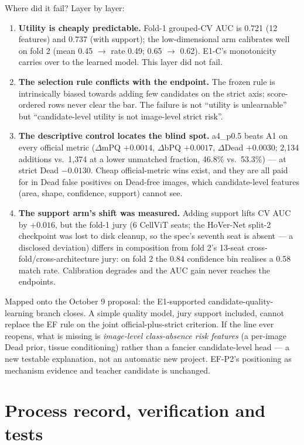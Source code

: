 \documentclass[11pt,a4paper]{article}
\begin{document}
Where did it fail? Layer by layer:

\begin{enumerate}
\item \textbf{Utility is cheaply predictable.} Fold-1 grouped-CV AUC is 0.721 (12 features) and 0.737 (with support); the low-dimensional arm calibrates well on fold 2 (mean 0.45 $\to$ rate 0.49; 0.65 $\to$ 0.62). E1-C's monotonicity carries over to the learned model. This layer did not fail.
\item \textbf{The selection rule conflicts with the endpoint.} The frozen rule is intrinsically biased towards adding few candidates on the strict axis; score-ordered rows never clear the bar. The failure is not ``utility is unlearnable'' but ``candidate-level utility is not image-level strict risk''.
\item \textbf{The descriptive control locates the blind spot.} a4\_p0.5 beats A1 on every official metric ($\Delta$mPQ $+0.0014$, $\Delta$bPQ $+0.0017$, $\Delta$Dead $+0.0030$; 2,134 additions vs.\ 1,374 at a lower unmatched fraction, 46.8\% vs.\ 53.3\%) --- at strict Dead $-0.0130$. Cheap official-metric wins exist, and they are all paid for in Dead false positives on Dead-free images, which candidate-level features (area, shape, confidence, support) cannot see.
\item \textbf{The support arm's shift was measured.} Adding support lifts CV AUC by $+0.016$, but the fold-1 jury (6 CellViT seats; the HoVer-Net split-2 checkpoint was lost to disk cleanup, so the spec's seventh seat is absent --- a disclosed deviation) differs in composition from fold 2's 13-seat cross-fold/cross-architecture jury: on fold 2 the 0.84 confidence bin realises a 0.58 match rate. Calibration degrades and the AUC gain never reaches the endpoints.
\end{enumerate}

Mapped onto the October 9 proposal: the E1-supported candidate-quality-learning branch closes. A simple quality model, jury support included, cannot replace the EF rule on the joint official-plus-strict criterion. If the line ever reopens, what is missing is \emph{image-level class-absence risk features} (a per-image Dead prior, tissue conditioning) rather than a fancier candidate-level head --- a new testable explanation, not an automatic new project. EF-P2's positioning as mechanism evidence and teacher candidate is unchanged.

\section{Process record, verification and tests}\label{sec:verify}
\end{document}
